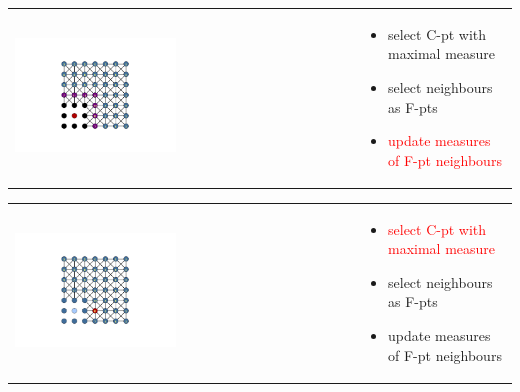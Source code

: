 \documentclass{beamer}
\newcommand{\re}[1]{{\textcolor{red}       {#1}}}
\begin{document}
\begin{frame}


\begin{tabular}{ p{} p{}}

\hspace{5mm} \includegraphics[trim = 85mm 40mm 85mm  40mm, clip, width=0.48\textwidth]{../figures/AMG4.png} &

\vspace{-1.75in}

\begin{itemize}
  \item select C-pt with maximal measure
  \item select neighbours as F-pts
  \item \re{update measures of F-pt neighbours}

\end{itemize}

\end{tabular}

\end{frame}

\begin{frame}



\begin{tabular}{ p{} p{}}

\hspace{5mm} \includegraphics[trim = 85mm 40mm 85mm  40mm, clip, width=0.48\textwidth]{../figures/AMG5.png} &

\vspace{-1.75in}

\begin{itemize}
  \item \re{select C-pt with maximal measure}
  \item select neighbours as F-pts
  \item update measures of F-pt neighbours

\end{itemize}

\end{tabular}

\end{frame}
\end{document}
